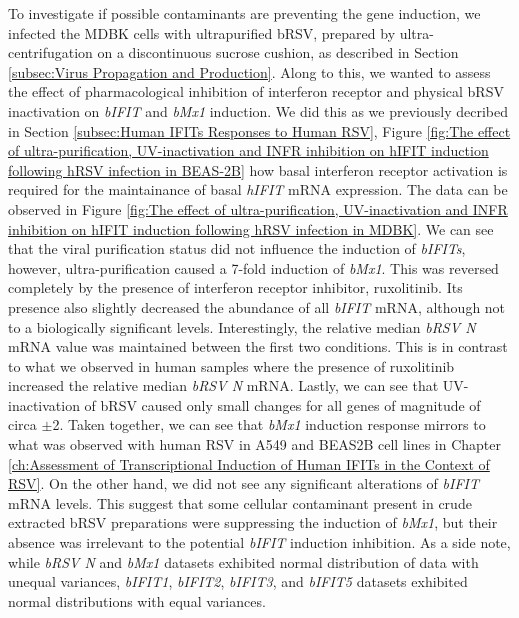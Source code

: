 To investigate if possible contaminants are preventing the gene induction, we infected the MDBK cells with ultrapurified bRSV, prepared by ultra-centrifugation on a discontinuous sucrose cushion, as described in Section \ref{subsec:Virus Propagation and Production}. Along to this, we wanted to assess the effect of pharmacological inhibition of interferon receptor and physical bRSV inactivation on \textit{bIFIT} and \textit{bMx1} induction. We did this as we previously decribed in Section \ref{subsec:Human IFITs Responses to Human RSV}, Figure \ref{fig:The effect of ultra-purification, UV-inactivation and INFR inhibition on hIFIT induction following hRSV infection in BEAS-2B} how basal interferon receptor activation is required for the maintainance of basal \textit{hIFIT} mRNA expression. The data can be observed in Figure \ref{fig:The effect of ultra-purification, UV-inactivation and INFR inhibition on hIFIT induction following hRSV infection in MDBK}. We can see that the viral purification status did not influence the induction of \textit{bIFITs}, however, ultra-purification caused a 7-fold induction of \textit{bMx1}. This was reversed completely by the presence of interferon receptor inhibitor, ruxolitinib. Its presence also slightly decreased the abundance of all \textit{bIFIT} mRNA, although not to a biologically significant levels. Interestingly, the relative median \textit{bRSV N} mRNA value was maintained between the first two conditions. This is in contrast to what we observed in human samples where the presence of ruxolitinib increased the relative median \textit{bRSV N} mRNA. Lastly, we can see that UV-inactivation of bRSV caused only small changes for all genes of magnitude of circa \(\pm\)2. Taken together, we can see that \textit{bMx1} induction response mirrors to what was observed with human RSV in A549 and BEAS2B cell lines in Chapter \ref{ch:Assessment of Transcriptional Induction of Human IFITs in the Context of RSV}. On the other hand, we did not see any significant alterations of \textit{bIFIT} mRNA levels. This suggest that some cellular contaminant present in crude extracted bRSV preparations were suppressing the induction of \textit{bMx1}, but their absence was irrelevant to the potential \textit{bIFIT} induction inhibition. As a side note, while \textit{bRSV N} and \textit{bMx1} datasets exhibited normal distribution of data with unequal variances, \textit{bIFIT1}, \textit{bIFIT2}, \textit{bIFIT3}, and \textit{bIFIT5} datasets exhibited normal distributions with equal variances.

